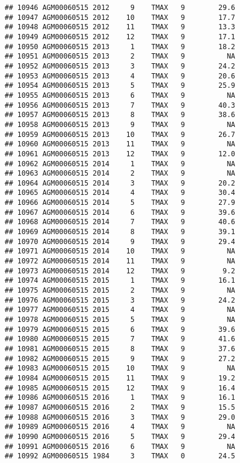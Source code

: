 \documentclass{article}\usepackage[]{graphicx}\usepackage[]{color}
\makeatletter
\newenvironment{kframe}{%
 \def\at@end@of@kframe{}%
 \ifinner\ifhmode%
  \def\at@end@of@kframe{\end{minipage}}%
  \begin{minipage}{\columnwidth}%
 \fi\fi%
 \def\FrameCommand##1{\hskip\@totalleftmargin \hskip-\fboxsep
 \colorbox{shadecolor}{##1}\hskip-\fboxsep
     \hskip-\linewidth \hskip-\@totalleftmargin \hskip\columnwidth}%
 \MakeFramed {\advance\hsize-\width
   \@totalleftmargin\z@ \linewidth\hsize
   \@setminipage}}%
 {\par\unskip\endMakeFramed%
 \at@end@of@kframe}
\newenvironment{knitrout}{}{} %
\makeatother
\begin{document}
\begin{knitrout}
\begin{kframe}
\begin{verbatim}
## 10946 AGM00060515 2012     9    TMAX   9        29.6
## 10947 AGM00060515 2012    10    TMAX   9        17.7
## 10948 AGM00060515 2012    11    TMAX   9        13.3
## 10949 AGM00060515 2012    12    TMAX   9        17.1
## 10950 AGM00060515 2013     1    TMAX   9        18.2
## 10951 AGM00060515 2013     2    TMAX   9          NA
## 10952 AGM00060515 2013     3    TMAX   9        24.2
## 10953 AGM00060515 2013     4    TMAX   9        20.6
## 10954 AGM00060515 2013     5    TMAX   9        25.9
## 10955 AGM00060515 2013     6    TMAX   9          NA
## 10956 AGM00060515 2013     7    TMAX   9        40.3
## 10957 AGM00060515 2013     8    TMAX   9        38.6
## 10958 AGM00060515 2013     9    TMAX   9          NA
## 10959 AGM00060515 2013    10    TMAX   9        26.7
## 10960 AGM00060515 2013    11    TMAX   9          NA
## 10961 AGM00060515 2013    12    TMAX   9        12.0
## 10962 AGM00060515 2014     1    TMAX   9          NA
## 10963 AGM00060515 2014     2    TMAX   9          NA
## 10964 AGM00060515 2014     3    TMAX   9        20.2
## 10965 AGM00060515 2014     4    TMAX   9        30.4
## 10966 AGM00060515 2014     5    TMAX   9        27.9
## 10967 AGM00060515 2014     6    TMAX   9        39.6
## 10968 AGM00060515 2014     7    TMAX   9        40.6
## 10969 AGM00060515 2014     8    TMAX   9        39.1
## 10970 AGM00060515 2014     9    TMAX   9        29.4
## 10971 AGM00060515 2014    10    TMAX   9          NA
## 10972 AGM00060515 2014    11    TMAX   9          NA
## 10973 AGM00060515 2014    12    TMAX   9         9.2
## 10974 AGM00060515 2015     1    TMAX   9        16.1
## 10975 AGM00060515 2015     2    TMAX   9          NA
## 10976 AGM00060515 2015     3    TMAX   9        24.2
## 10977 AGM00060515 2015     4    TMAX   9          NA
## 10978 AGM00060515 2015     5    TMAX   9          NA
## 10979 AGM00060515 2015     6    TMAX   9        39.6
## 10980 AGM00060515 2015     7    TMAX   9        41.6
## 10981 AGM00060515 2015     8    TMAX   9        37.6
## 10982 AGM00060515 2015     9    TMAX   9        27.2
## 10983 AGM00060515 2015    10    TMAX   9          NA
## 10984 AGM00060515 2015    11    TMAX   9        19.2
## 10985 AGM00060515 2015    12    TMAX   9        16.4
## 10986 AGM00060515 2016     1    TMAX   9        16.1
## 10987 AGM00060515 2016     2    TMAX   9        15.5
## 10988 AGM00060515 2016     3    TMAX   9        29.0
## 10989 AGM00060515 2016     4    TMAX   9          NA
## 10990 AGM00060515 2016     5    TMAX   9        29.4
## 10991 AGM00060515 2016     6    TMAX   9          NA
## 10992 AGM00060515 1984     3    TMAX   0        24.5

\end{verbatim}
\end{kframe}
\end{knitrout}
\end{document}
